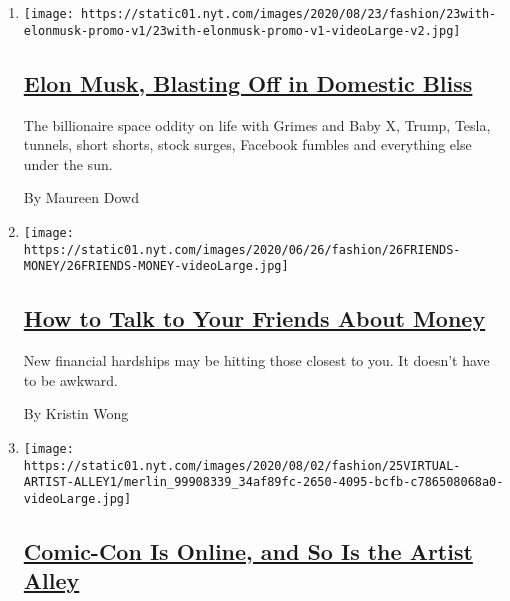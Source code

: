 \begin{enumerate}
\def\labelenumi{\arabic{enumi}.}
\item
  \texttt{[image: https://static01.nyt.com/images/2020/08/23/fashion/23with-elonmusk-promo-v1/23with-elonmusk-promo-v1-videoLarge-v2.jpg]}

  \hypertarget{elon-musk-blasting-off-in-domestic-bliss}{%
  \subsection{\texorpdfstring{\href{/2020/07/25/style/elon-musk-maureen-dowd.html}{Elon
  Musk, Blasting Off in Domestic
  Bliss}}{Elon Musk, Blasting Off in Domestic Bliss}}\label{elon-musk-blasting-off-in-domestic-bliss}}

  The billionaire space oddity on life with Grimes and Baby X, Trump,
  Tesla, tunnels, short shorts, stock surges, Facebook fumbles and
  everything else under the sun.

  By Maureen Dowd
\item
  \texttt{[image: https://static01.nyt.com/images/2020/06/26/fashion/26FRIENDS-MONEY/26FRIENDS-MONEY-videoLarge.jpg]}

  \hypertarget{how-to-talk-to-your-friends-about-money}{%
  \subsection{\texorpdfstring{\href{/2020/07/25/style/how-to-talk-to-friends-about-money.html}{How
  to Talk to Your Friends About
  Money}}{How to Talk to Your Friends About Money}}\label{how-to-talk-to-your-friends-about-money}}

  New financial hardships may be hitting those closest to you. It
  doesn't have to be awkward.

  By Kristin Wong
\item
  \texttt{[image: https://static01.nyt.com/images/2020/08/02/fashion/25VIRTUAL-ARTIST-ALLEY1/merlin\_99908339\_34af89fc-2650-4095-bcfb-c786508068a0-videoLarge.jpg]}

  \hypertarget{comic-con-is-online-and-so-is-the-artist-alley}{%
  \subsection{\texorpdfstring{\href{/2020/07/25/style/comic-con-online-artist-alley.html}{Comic-Con
  Is Online, and So Is the Artist
  Alley}}{Comic-Con Is Online, and So Is the Artist Alley}}\label{comic-con-is-online-and-so-is-the-artist-alley}}


\end{enumerate}
